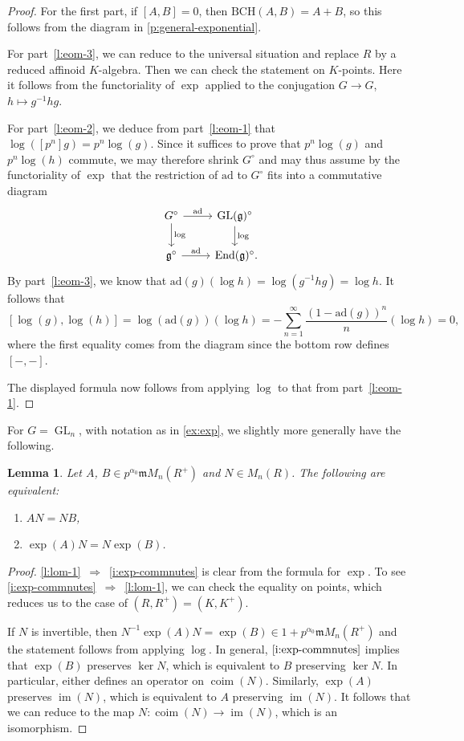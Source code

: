 \documentclass[10pt,a4paper]{article}
\newtheorem{Lemma}[thm]{Lemma}
\theoremstyle{definition}
\theoremstyle{remark}
\newcommand{\m}{\mathfrak{m}}
\newcommand{\im}{\operatorname{im}}
\newcommand{\End}{\operatorname{End}}
\newcommand{\GL}{\operatorname{GL}}
\newcommand{\ad}{\mathrm{ad}}
\newcommand{\coim}{\operatorname{coim}}
\numberwithin{equation}{section}
\begin{document}
\begin{proof}
	For the first part, if $[A,B]=0$, then $\mathrm{BCH}(A,B)=A+B$, so this follows from the diagram in \cref{p:general-exponential}.
	
	For part~\eqref{l:eom-3}, we can reduce to the universal situation and replace $R$ by a reduced affinoid $K$-algebra. Then we can check the statement on $K$-points. Here it follows from the functoriality of $\exp$ applied to the conjugation $G\to G$, $h\mapsto g^{-1}hg$.
	
	For part~\eqref{l:eom-2}, we deduce from part~\eqref{l:eom-1} that $\log([p^n]g)=p^n\log(g)$. Since it suffices to prove that $p^n\log(g)$ and $p^n\log(h)$ commute, we may therefore shrink $G^\circ$ and may thus assume by the functoriality of $\exp$ that the restriction of $\ad$ to $G^\circ$ fits into a commutative diagram
	\[\begin{tikzcd}
		G^\circ \arrow[r, "\ad"] \arrow[d, "\log"] & \GL(\mathfrak g)^\circ \arrow[d, "\log"] \\
		\mathfrak g^\circ \arrow[r, "\ad"] & \End(\mathfrak g)^\circ\rlap{.}
	\end{tikzcd}\]
	By part~\eqref{l:eom-3}, we know that $\ad(g)(\log h)=\log(g^{-1}hg)=\log h$. It follows that
	\[ [\log(g),\log(h)]=\log(\ad(g))(\log h)=-\sum_{n=1}^\infty\frac{(1-\ad(g))^n}{n}(\log h)=0,\]
	where the first equality comes from the diagram since the bottom row defines $[-,-]$.
	
	The displayed formula now follows from applying $\log $ to that from part~\eqref{l:eom-1}.
\end{proof}

For $G=\GL_n$, with notation as in \cref{ex:exp}, we slightly more generally have the following. 

\begin{Lemma}\label{l:log-on-matrix}
  Let $A$, $B\in p^{\alpha_0}\m M_n(R^+)$ and $N\in M_n(R)$. The following are equivalent:
  
		\begin{enumerate}
			\item\label{l:lom-1} $AN=NB$, 
			\item \label{i:exp-commnutes}$\exp(A)N=N\exp(B)$.
		\end{enumerate}
\end{Lemma}

\begin{proof}
\eqref{l:lom-1}~$\Rightarrow$~\eqref{i:exp-commnutes} is clear from the formula for $\exp$.  To see \eqref{i:exp-commnutes}~$\Rightarrow$~\eqref{l:lom-1}, we can check the equality on points, which reduces us to the case of $(R,R^+)=(K,K^+)$.
	
	If $N$ is invertible, then $N^{-1}\exp(A)N=\exp(B)\in 1+p^{\alpha_0}\m M_n(R^+)$ and the statement follows from applying $\log$.
	In general,  $\eqref{i:exp-commnutes}$ implies that $\exp(B)$ preserves $\ker N$, which is equivalent to $B$ preserving $\ker N$. In particular, either defines an operator on $\coim(N)$. Similarly, $\exp(A)$ preserves $\im(N)$, which is equivalent to $A$ preserving $\im(N)$. It follows that we can reduce to the  map $N\colon \coim(N)\to \im(N)$, which is an isomorphism.
\end{proof}
\end{document}
